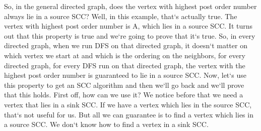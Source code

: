 So, in the general directed graph, does the vertex with highest post order number always lie in a source SCC? Well, in this example, that`s actually true.
The vertex with highest post order number is A, which lies in a source SCC\@.
It turns out that this property is true and we`re going to prove that it`s true.
So, in every directed graph, when we run DFS on that directed graph, it doesn`t matter on which vertex we start at and which is the ordering on the neighbors, for every directed graph, for every DFS run on that directed graph, the vertex with the highest post order number is guaranteed to lie in a source SCC\@.
Now, let`s use this property to get an SCC algorithm and then we`ll go back and we`ll prove that this holds.
First off, how can we use it? We notice before that we need a vertex that lies in a sink SCC\@.
If we have a vertex which lies in the source SCC, that`s not useful for us.
But all we can guarantee is to find a vertex which lies in a source SCC\@.
We don`t know how to find a vertex in a sink SCC\@.

